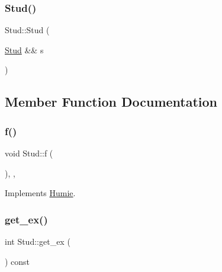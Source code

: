 \mbox{\label{class_stud_a0dc47589ff92661e3bb7ea2070a4fd7d}} 
\subsubsection{\texorpdfstring{Stud()}{Stud()}\hspace{0.1cm}{\footnotesize\ttfamily [4/4]}}
{\footnotesize\ttfamily Stud\+::\+Stud (\begin{DoxyParamCaption}\item[{\mbox{\hyperlink{class_stud}{Stud}} \&\&}]{s }\end{DoxyParamCaption})\hspace{0.3cm}{\ttfamily [noexcept]}}



\subsection{Member Function Documentation}
\mbox{\label{class_stud_a6ebf0056208a353346da33a779763e4f}} 
\subsubsection{\texorpdfstring{f()}{f()}}
{\footnotesize\ttfamily void Stud\+::f (\begin{DoxyParamCaption}{ }\end{DoxyParamCaption})\hspace{0.3cm}{\ttfamily [inline]}, {\ttfamily [override]}, {\ttfamily [virtual]}}



Implements \mbox{\hyperlink{class_humie_a1bfe9cf46655ca5952b83c1652d8c0a1}{Humie}}.

\mbox{\label{class_stud_ad9d3e3bdd3a203ea8d1a50f5fe850022}} 
\subsubsection{\texorpdfstring{get\_ex()}{get\_ex()}}
{\footnotesize\ttfamily int Stud\+::get\+\_\+ex (\begin{DoxyParamCaption}{ }\end{DoxyParamCaption}) const\hspace{0.3cm}{\ttfamily [inline]}}

